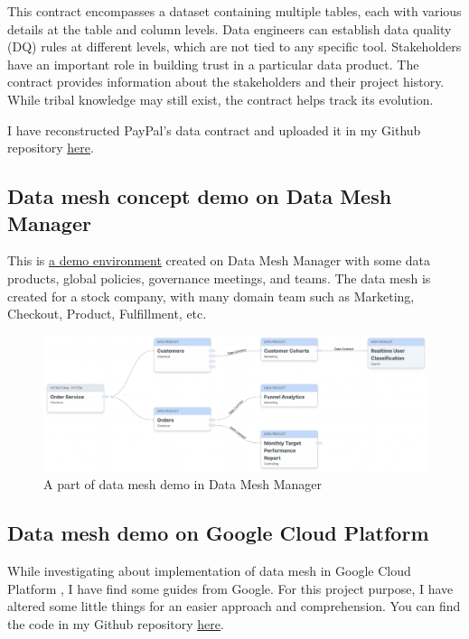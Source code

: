 \documentclass[12pt, a4paper]{book}
\begin{document}
This contract encompasses a dataset containing multiple tables, each with various details at the table and column levels. Data engineers can establish data quality (DQ) rules at different levels, which are not tied to any specific tool. Stakeholders have an important role in building trust in a particular data product. The contract provides information about the stakeholders and their project history. While tribal knowledge may still exist, the contract helps track its evolution.

I have reconstructed PayPal's data contract and uploaded it in my Github repository \href{https://github.com/ngocminhta/DataMeshReport/tree/main/DataContractPayPal.md}{\underline{here}}.

\subsection{Data mesh concept demo on Data Mesh Manager}
This is \href{https://demo.datamesh-manager.com/}{\underline{a demo environment}} created on Data Mesh Manager with some data products, global policies, governance meetings, and teams. The data mesh is created for a stock company, with many domain team such as Marketing, Checkout, Product, Fulfillment, etc.

\begin{figure}[ht]
	\vspace{-.2cm}
	\begin{framed}
		\centering
		\includegraphics[width=13cm]{DataMeshManagerDemo.png}
		\caption{A part of data mesh demo in Data Mesh Manager}
		\label{DataMeshManagerDemo}
	\end{framed}
	\vspace{-.5cm}
\end{figure}

\subsection{Data mesh demo on Google Cloud Platform}
While investigating about implementation of data mesh in Google Cloud Platform \cite{DataMeshGcloud}, I have find some guides from Google. For this project purpose, I have altered some little things for an easier approach and comprehension. You can find the code in my Github repository \href{https://github.com/ngocminhta/DataMeshDemoGCP}{\underline{here}}.
\end{document}
